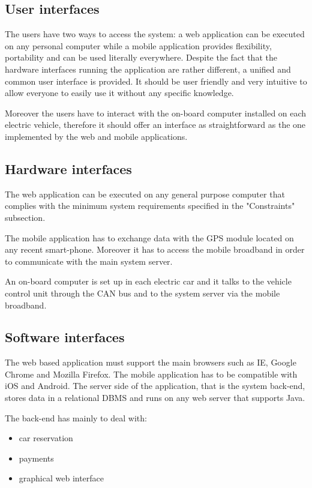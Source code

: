 \subsection{User interfaces}
The users have two ways to access the system: a web application can be executed on any personal computer while a mobile application provides flexibility, portability and can be used literally everywhere. Despite the fact that the hardware interfaces running the application are rather different, a unified and common user interface is provided. It should be user friendly and very intuitive to allow everyone to easily use it without any specific knowledge.

Moreover the users have to interact with the on-board computer installed on each electric vehicle, therefore it should offer an interface as straightforward as the one implemented by the web and mobile applications.

\subsection{Hardware interfaces}
The web application can be executed on any general purpose computer that complies with the minimum system requirements specified in the "Constraints" subsection.

The mobile application has to exchange data with the GPS module located on any recent smart-phone. Moreover it has to access the mobile broadband in order to communicate with the main system server.

An on-board computer is set up in each electric car and it talks to the vehicle control unit through the CAN bus and to the system server via the mobile broadband.

\subsection{Software interfaces}
The web based application must support the main browsers such as IE, Google Chrome and Mozilla Firefox. The mobile application has to be compatible with iOS and Android. The server side of the application, that is the system back-end, stores data in a relational DBMS and runs on any web server that supports Java.

The back-end has mainly to deal with:
\begin{itemize}
\item car reservation
\item payments
\item graphical web interface
\end{itemize}